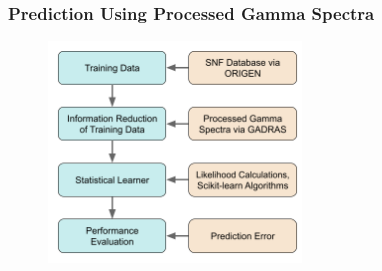 
\begin{frame}
  \frametitle{Prediction Using Processed Gamma Spectra}
  \begin{figure}
    \centering
    \includegraphics[width=0.6\textwidth]{./figures/methodology2.png}
  \end{figure}
\end{frame}

